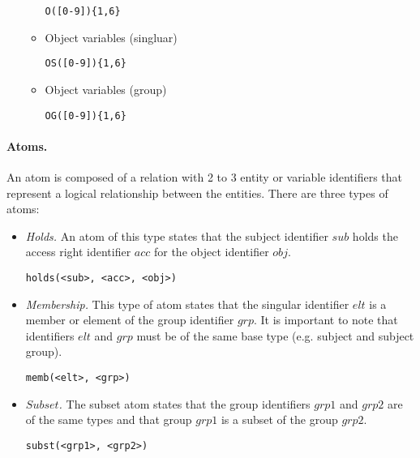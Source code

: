\documentclass[10pt, twocolumn]{article}
\begin{document}
\begin{itemize}
\begin{itemize}
                  \begin{verbatim}O([0-9]){1,6}\end{verbatim}
                \item
                  Object variables (singluar)

                  \begin{verbatim}OS([0-9]){1,6}\end{verbatim}
                \item
                  Object variables (group)

                  \begin{verbatim}OG([0-9]){1,6}\end{verbatim}
              \end{itemize}
          \end{itemize}

        \paragraph{Atoms.}
          An atom is composed of a relation with 2 to 3 entity or variable
          identifiers that represent a logical relationship between the
          entities. There are three types of atoms:

          \begin{itemize}
            \item
              {\em Holds.} An atom of this type states that the subject
              identifier $sub$ holds the access right identifier $acc$
              for the object identifier $obj$.
         
              \begin{verbatim}holds(<sub>, <acc>, <obj>)\end{verbatim}
            \item
              {\em Membership.} This type of atom states that the singular
              identifier $elt$ is a member or element of the group identifier
              $grp$. It is important to note that identifiers $elt$ and $grp$
              must be of the same base type (e.g. subject and subject group).
         
              \begin{verbatim}memb(<elt>, <grp>)\end{verbatim}
            \item
              {\em $Subset$.} The subset atom states that the group identifiers
              $grp1$ and $grp2$ are of the same types and that group $grp1$ is
              a subset of the group $grp2$.

              \begin{verbatim}subst(<grp1>, <grp2>)\end{verbatim}
          \end{itemize}
\end{document}
